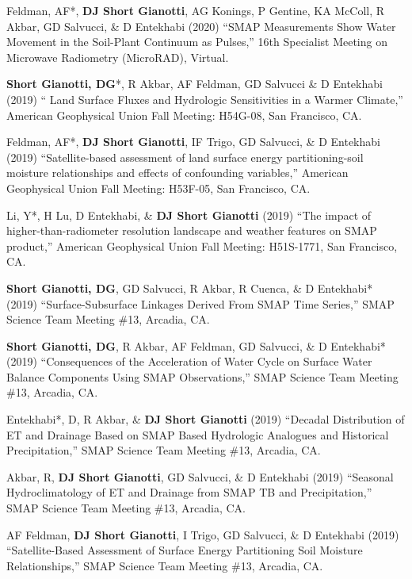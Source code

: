 \documentclass[10pt, a4paper]{article}
\newcommand{\lbr}{\vspace*{12pt}}
\newcommand{\years}[1]{\mbox{}\marginnote{\scriptsize #1}} %
\begin{document}
\years{2020}Feldman, AF*, \textbf{DJ Short Gianotti}, AG Konings, P Gentine, KA McColl, R Akbar, GD Salvucci, \& D Entekhabi (2020) ``SMAP Measurements Show Water Movement in the Soil-Plant Continuum as Pulses,'' 16th Specialist Meeting on Microwave Radiometry (MicroRAD), Virtual.\lbr %


\years{2019}\textbf{Short Gianotti, DG}*, R Akbar, AF Feldman, GD Salvucci \& D Entekhabi (2019) `` Land Surface Fluxes and Hydrologic Sensitivities in a Warmer Climate,'' American Geophysical Union Fall Meeting: H54G-08, San Francisco, CA.\lbr %

\years{2019}Feldman, AF*, \textbf{DJ Short Gianotti}, IF Trigo, GD Salvucci, \& D Entekhabi (2019) ``Satellite-based assessment of land surface energy partitioning-soil moisture relationships and effects of confounding variables,'' American Geophysical Union Fall Meeting: H53F-05, San Francisco, CA.\lbr %

\years{2019}Li, Y*, H Lu, D Entekhabi, \& \textbf{DJ Short Gianotti} (2019) ``The impact of higher-than-radiometer resolution landscape and weather features on SMAP product,'' American Geophysical Union Fall Meeting: H51S-1771, San Francisco, CA.\lbr %

\years{2019}\textbf{Short Gianotti, DG}, GD Salvucci, R Akbar, R Cuenca, \& D Entekhabi* (2019) ``Surface-Subsurface Linkages Derived From SMAP Time Series,'' SMAP Science Team Meeting \#13, Arcadia, CA.\lbr %

\years{2019}\textbf{Short Gianotti, DG}, R Akbar, AF Feldman, GD Salvucci, \& D Entekhabi* (2019) ``Consequences of the Acceleration of Water Cycle on Surface Water Balance Components Using SMAP Observations,'' SMAP Science Team Meeting \#13, Arcadia, CA.\lbr %

\years{2019}Entekhabi*, D, R Akbar, \& \textbf{DJ Short Gianotti} (2019) ``Decadal Distribution of ET and Drainage Based on SMAP Based Hydrologic Analogues and Historical Precipitation,'' SMAP Science Team Meeting \#13, Arcadia, CA.\lbr %

\years{2019}Akbar, R, \textbf{DJ Short Gianotti}, GD Salvucci, \& D Entekhabi (2019) ``Seasonal Hydroclimatology of ET and Drainage from SMAP TB and Precipitation,'' SMAP Science Team Meeting \#13, Arcadia, CA.\lbr %

\years{2019}AF Feldman, \textbf{DJ Short Gianotti}, I Trigo, GD Salvucci, \& D Entekhabi (2019) ``Satellite-Based Assessment of Surface Energy Partitioning Soil Moisture Relationships,'' SMAP Science Team Meeting \#13, Arcadia, CA.\lbr %
 
\end{document}

